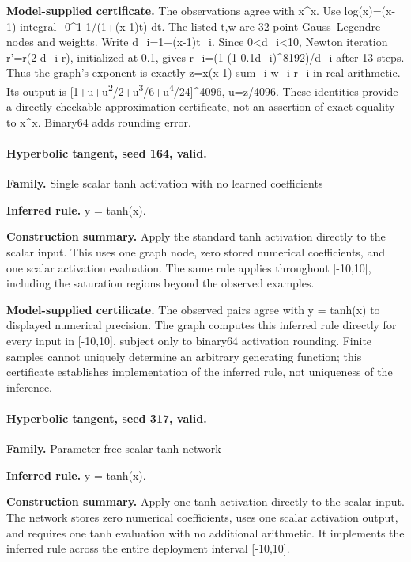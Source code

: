 \textbf{Model-supplied certificate.} The observations agree with x\textasciicircum{}x. Use log(x)=(x-1) integral\_0\textasciicircum{}1 1/(1+(x-1)t) dt. The listed t,w are 32-point Gauss--Legendre nodes and weights. Write d\_i=1+(x-1)t\_i. Since 0<d\_i<10, Newton iteration r'=r(2-d\_i r), initialized at 0.1, gives r\_i=(1-(1-0.1d\_i)\textasciicircum{}8192)/d\_i after 13 steps. Thus the graph's exponent is exactly z=x(x-1) sum\_i w\_i r\_i in real arithmetic. Its output is [1+u+u\textsuperscript{2}/2+u\textsuperscript{3}/6+u\textsuperscript{4}/24]\textasciicircum{}4096, u=z/4096. These identities provide a directly checkable approximation certificate, not an assertion of exact equality to x\textasciicircum{}x. Binary64 adds rounding error.


\paragraph{Hyperbolic tangent, seed 164, valid.}

\textbf{Family.} Single scalar tanh activation with no learned coefficients


\textbf{Inferred rule.} y = tanh(x).


\textbf{Construction summary.} Apply the standard tanh activation directly to the scalar input. This uses one graph node, zero stored numerical coefficients, and one scalar activation evaluation. The same rule applies throughout [-10,10], including the saturation regions beyond the observed examples.


\textbf{Model-supplied certificate.} The observed pairs agree with y = tanh(x) to displayed numerical precision. The graph computes this inferred rule directly for every input in [-10,10], subject only to binary64 activation rounding. Finite samples cannot uniquely determine an arbitrary generating function; this certificate establishes implementation of the inferred rule, not uniqueness of the inference.


\paragraph{Hyperbolic tangent, seed 317, valid.}

\textbf{Family.} Parameter-free scalar tanh network


\textbf{Inferred rule.} y = tanh(x).


\textbf{Construction summary.} Apply one tanh activation directly to the scalar input. The network stores zero numerical coefficients, uses one scalar activation output, and requires one tanh evaluation with no additional arithmetic. It implements the inferred rule across the entire deployment interval [-10,10].


